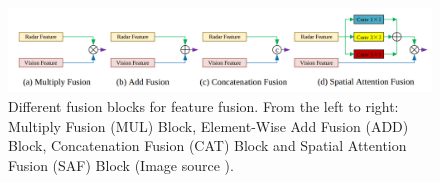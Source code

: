 \documentclass[report.tex]{subfiles}
\begin{document}
    \begin{figure}[h]
        \centering
        \includegraphics[width=1.0\textwidth]{images/methods/saf_fcos/different_fusion_blocks_for_feature_fusion.png}
        \caption{Different fusion blocks for feature fusion. From the left to right: Multiply Fusion (MUL) Block, Element-Wise Add Fusion (ADD) Block, Concatenation Fusion (CAT) Block and Spatial Attention Fusion (SAF) Block (Image source \cite{chang2020spatial}).}
        \label{fig:saffcos_different_fusion_blocks_for_feature_fusion}
    \end{figure}



\end{document}
